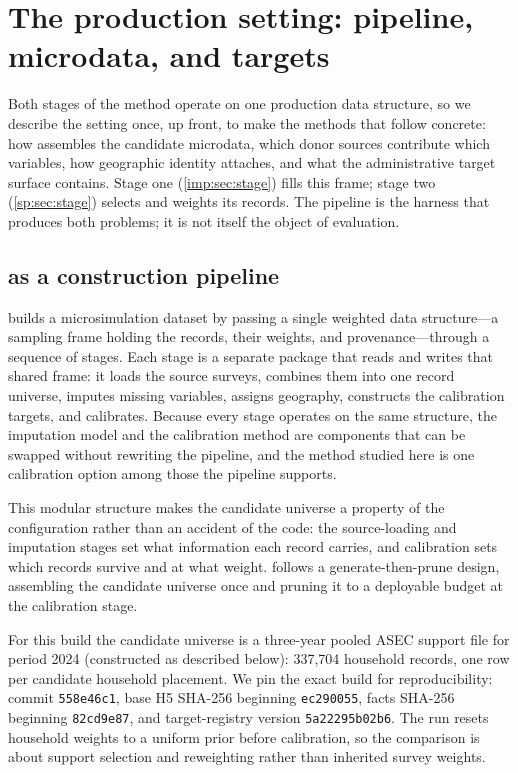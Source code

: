 \section{The production setting: pipeline, microdata, and targets}
\label{sec:construction}
\label{sp:sec:data}

Both stages of the method operate on one production data structure, so we describe the setting once,
up front, to make the methods that follow concrete: how \populace{} assembles the candidate
microdata, which donor sources contribute which variables, how geographic identity attaches, and what
the administrative target surface contains. Stage one (\autoref{imp:sec:stage}) fills this frame;
stage two (\autoref{sp:sec:stage}) selects and weights its records. The pipeline is the harness that
produces both problems; it is not itself the object of evaluation.

\subsection{\populace{} as a construction pipeline}

\populace{} builds a microsimulation dataset by passing a single weighted data structure---a sampling
frame holding the records, their weights, and provenance---through a sequence of stages. Each stage is
a separate package that reads and writes that shared frame: it loads the source surveys, combines them
into one record universe, imputes missing variables, assigns geography, constructs the calibration
targets, and calibrates. Because every stage operates on the same structure, the imputation model and
the calibration method are components that can be swapped without rewriting the pipeline, and the
method studied here is one calibration option among those the pipeline supports.

This modular structure makes the candidate universe a property of the configuration rather than an
accident of the code: the source-loading and imputation stages set what information each record
carries, and calibration sets which records survive and at what weight. \populace{} follows a
generate-then-prune design, assembling the candidate universe once and pruning it to a deployable
budget at the calibration stage.

For this build the candidate universe is a three-year pooled ASEC support file for period 2024
(constructed as described below): 337{,}704 household records, one row per candidate household placement.
We pin the exact build for
reproducibility: \populace{} commit \texttt{558e46c1}, base H5 SHA-256 beginning
\texttt{ec290055}, \chronicle{} facts SHA-256 beginning \texttt{82cd9e87}, and target-registry version
\texttt{5a22295b02b6}. The run resets household weights to a uniform prior before calibration, so the
comparison is about support selection and reweighting rather than inherited survey weights.

